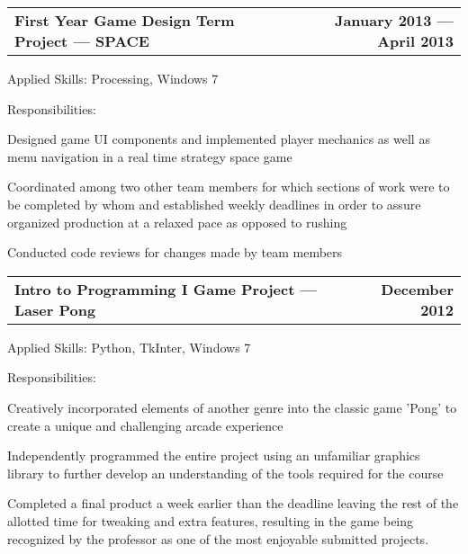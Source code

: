 \documentclass[10pt,letterpaper]{article}
\makeatletter
\newenvironment{indentsection}[1]%
{\begin{list}{}%
  {\setlength{\leftmargin}{#1}}%
  \item[]%
}
{\end{list}}
\newcommand{\headerrow}[2]
{\begin{tabular*}{\linewidth}{l@{\extracolsep{\fill}}r}
  #1 &
  #2 \\
\end{tabular*}}
\makeatother
\begin{document}
\begin{itemize}
  \item
  \headerrow
    {\textbf{First Year Game Design Term Project — SPACE}}
    {\textbf{January 2013 — April 2013}}
  \begin{indentsection}{1em}
    \begin{description*}
      \item[Applied Skills:]
      Processing, Windows 7
      \item[Responsibilities:]
      \hfill
      \begin{itemize*}
        \item Designed game UI components and implemented player mechanics as well
        as menu navigation in a real time strategy space game
        \item Coordinated among two other team members for which sections of work
        were to be completed by whom and established weekly deadlines in order to
        assure organized production at a relaxed pace as opposed to rushing
        \item Conducted code reviews for changes made by team members
      \end{itemize*}
    \end{description*}
  \end{indentsection}

  \item
  \headerrow
    {\textbf{Intro to Programming I Game Project — Laser Pong}}
    {\textbf{December 2012}}
  \begin{indentsection}{1em}
    \begin{description*}
      \item[Applied Skills:]
      Python, TkInter, Windows 7
      \item[Responsibilities:]
      \hfill
      \begin{itemize*}
        \item Creatively incorporated elements of another genre into the classic
        game 'Pong' to create a unique and challenging arcade experience
        \item Independently programmed the entire project using an unfamiliar
        graphics library to further develop an understanding of the tools required
        for the course
        \item Completed a final product a week earlier than the deadline leaving
        the rest of the allotted time for tweaking and extra features, resulting
        in the game being recognized by the professor as one of the most enjoyable
        submitted projects.
      \end{itemize*}
    \end{description*}
  \end{indentsection}

\end{itemize}
\end{document}
